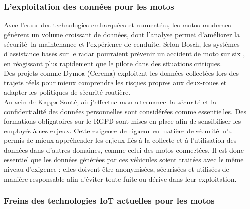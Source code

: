 \subsubsection{L'exploitation des données pour les motos}
Avec l’essor des technologies embarquées et connectées, les motos modernes génèrent un volume croissant de données, dont l’analyse permet d’améliorer la sécurité, la maintenance et l’expérience de conduite.
Selon Bosch, les systèmes d’assistance basés sur le radar pourraient prévenir un accident de moto sur six \cite{aras_bosh_site_off}, en réagissant plus rapidement que le pilote dans des situations critiques. \\
Des projets comme Dymoa (Cerema) exploitent les données collectées lors des trajets réels pour mieux comprendre les risques propres aux deux-roues et adapter les politiques de sécurité routière.\\
Au sein de Kappa Santé, où j’effectue mon alternance, la sécurité et la confidentialité des données personnelles sont considérées comme essentielles. Des formations obligatoires sur le RGPD sont mises en place afin de sensibiliser les employés à ces enjeux. Cette exigence de rigueur en matière de sécurité m’a permis de mieux appréhender les enjeux liés à la collecte et à l’utilisation des données dans d’autres domaines, comme celui des motos connectées. Il est donc essentiel que les données générées par ces véhicules soient traitées avec le même niveau d’exigence : elles doivent être anonymisées, sécurisées et utilisées de manière responsable afin d’éviter toute fuite ou dérive dans leur exploitation.



\subsubsection{Freins des technologies IoT actuelles pour les motos}

